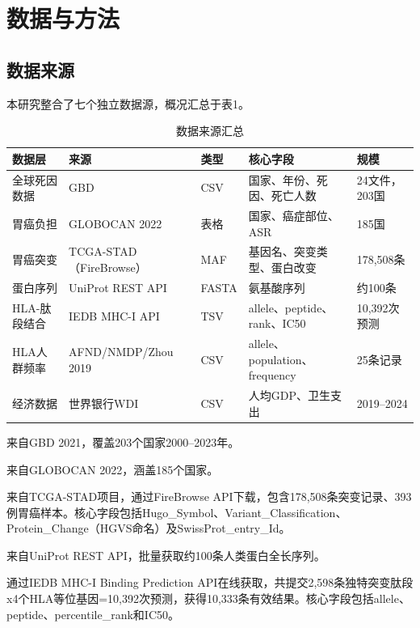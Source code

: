 \documentclass[12pt,a4paper]{ctexart}
\begin{document}
\section{数据与方法}

\subsection{数据来源}

本研究整合了七个独立数据源，概况汇总于表1。

\begin{table}[htbp]
\centering
\caption{数据来源汇总}
\label{tab:datasource}
\renewcommand{\arraystretch}{1.1}
\begin{tabular}{lllp{3.5cm}l}
\toprule
数据层 & 来源 & 类型 & 核心字段 & 规模 \\
\midrule
全球死因数据 & GBD & CSV & 国家、年份、死因、死亡人数 & 24文件，203国 \\
胃癌负担 & GLOBOCAN 2022 & 表格 & 国家、癌症部位、ASR & 185国 \\
胃癌突变 & TCGA-STAD（FireBrowse）& MAF & 基因名、突变类型、蛋白改变 & 178,508条 \\
蛋白序列 & UniProt REST API & FASTA & 氨基酸序列 & 约100条 \\
HLA-肽段结合 & IEDB MHC-I API & TSV & allele、peptide、rank、IC50 & 10,392次预测 \\
HLA人群频率 & AFND/NMDP/Zhou 2019 & CSV & allele、population、frequency & 25条记录 \\
经济数据 & 世界银行WDI & CSV & 人均GDP、卫生支出 & 2019--2024 \\
\bottomrule
\end{tabular}
\end{table}

来自GBD 2021\cite{ref7}，覆盖203个国家2000--2023年。

来自GLOBOCAN 2022\cite{ref8}，涵盖185个国家。

来自TCGA-STAD项目\cite{ref3}，通过FireBrowse API下载，包含178,508条突变记录、393例胃癌样本。核心字段包括Hugo\_Symbol、Variant\_Classification、Protein\_Change（HGVS命名）及SwissProt\_entry\_Id。

来自UniProt REST API\cite{ref4}，批量获取约100条人类蛋白全长序列。

通过IEDB MHC-I Binding Prediction API\cite{ref5}在线获取，共提交2,598条独特突变肽段x4个HLA等位基因=10,392次预测，获得10,333条有效结果。核心字段包括allele、peptide、percentile\_rank和IC50。
\end{document}
